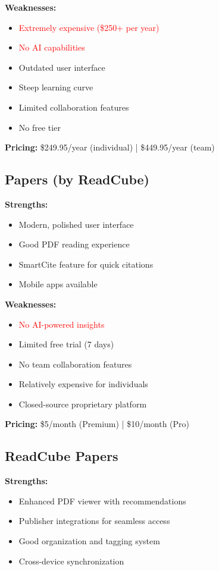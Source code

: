 \textbf{Weaknesses:}
\begin{itemize}[leftmargin=*]
    \item \textcolor{red}{Extremely expensive (\$250+ per year)}
    \item \textcolor{red}{No AI capabilities}
    \item Outdated user interface
    \item Steep learning curve
    \item Limited collaboration features
    \item No free tier
\end{itemize}

\textbf{Pricing:} \$249.95/year (individual) | \$449.95/year (team)

\subsection{Papers (by ReadCube)}

\textbf{Strengths:}
\begin{itemize}[leftmargin=*]
    \item Modern, polished user interface
    \item Good PDF reading experience
    \item SmartCite feature for quick citations
    \item Mobile apps available
\end{itemize}

\textbf{Weaknesses:}
\begin{itemize}[leftmargin=*]
    \item \textcolor{red}{No AI-powered insights}
    \item Limited free trial (7 days)
    \item No team collaboration features
    \item Relatively expensive for individuals
    \item Closed-source proprietary platform
\end{itemize}

\textbf{Pricing:} \$5/month (Premium) | \$10/month (Pro)

\subsection{ReadCube Papers}

\textbf{Strengths:}
\begin{itemize}[leftmargin=*]
    \item Enhanced PDF viewer with recommendations
    \item Publisher integrations for seamless access
    \item Good organization and tagging system
    \item Cross-device synchronization
\end{itemize}

